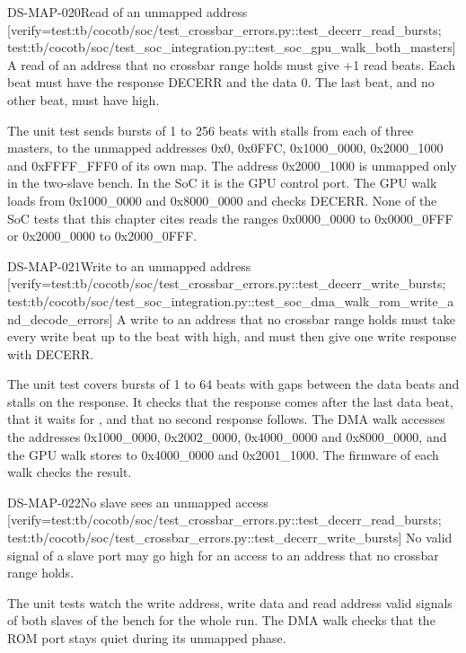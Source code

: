 \begin{requirement}{DS-MAP-020}{Read of an unmapped address}
[verify={test:tb/cocotb/soc/test_crossbar_errors.py::test_decerr_read_bursts; test:tb/cocotb/soc/test_soc_integration.py::test_soc_gpu_walk_both_masters}]
A read of an address that no crossbar range holds must give +1 read beats. Each beat must have the response DECERR and the data 0. The last beat, and no other beat, must have  high.
\end{requirement}
\begin{information}
The unit test sends bursts of 1 to 256 beats with stalls from each of three masters, to the unmapped addresses 0x0, 0x0FFC, 0x1000\_0000, 0x2000\_1000 and 0xFFFF\_FFF0 of its own map. The address 0x2000\_1000 is unmapped only in the two-slave bench. In the SoC it is the GPU control port. The GPU walk loads from 0x1000\_0000 and 0x8000\_0000 and checks DECERR. None of the SoC tests that this chapter cites reads the ranges 0x0000\_0000 to 0x0000\_0FFF or 0x2000\_0000 to 0x2000\_0FFF.
\end{information}

\begin{requirement}{DS-MAP-021}{Write to an unmapped address}
[verify={test:tb/cocotb/soc/test_crossbar_errors.py::test_decerr_write_bursts; test:tb/cocotb/soc/test_soc_integration.py::test_soc_dma_walk_rom_write_and_decode_errors}]
A write to an address that no crossbar range holds must take every write beat up to the beat with  high, and must then give one write response with DECERR.
\end{requirement}
\begin{information}
The unit test covers bursts of 1 to 64 beats with gaps between the data beats and stalls on the response. It checks that the response comes after the last data beat, that it waits for , and that no second response follows. The DMA walk accesses the addresses 0x1000\_0000, 0x2002\_0000, 0x4000\_0000 and 0x8000\_0000, and the GPU walk stores to 0x4000\_0000 and 0x2001\_1000. The firmware of each walk checks the result.
\end{information}

\begin{requirement}{DS-MAP-022}{No slave sees an unmapped access}
[verify={test:tb/cocotb/soc/test_crossbar_errors.py::test_decerr_read_bursts; test:tb/cocotb/soc/test_crossbar_errors.py::test_decerr_write_bursts}]
No valid signal of a slave port may go high for an access to an address that no crossbar range holds.
\end{requirement}
\begin{information}
The unit tests watch the write address, write data and read address valid signals of both slaves of the bench for the whole run. The DMA walk checks that the ROM port stays quiet during its unmapped phase.
\end{information}


